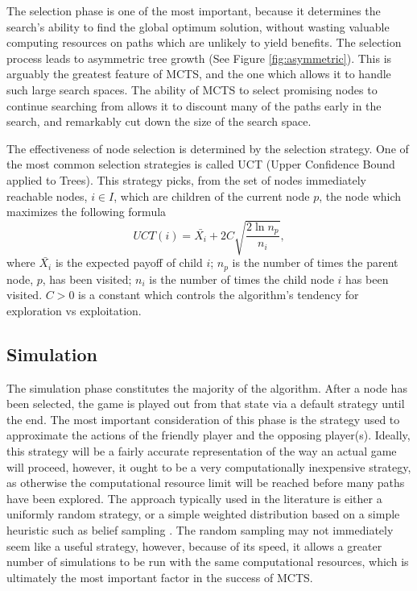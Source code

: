 \documentclass[11pt, letterpaper, twoside]{article}
\begin{document}
The selection phase is one of the most important, because it determines the search's ability to find the global optimum solution, without wasting valuable computing resources on paths which are unlikely to yield benefits. The selection process leads to asymmetric tree growth (See Figure \ref{fig:asymmetric}). This is arguably the greatest feature of MCTS, and the one which allows it to handle such large search spaces. The ability of MCTS to select promising nodes to continue searching from allows it to discount many of the paths early in the search, and remarkably cut down the size of the search space.

The effectiveness of node selection is determined by the selection strategy. One of the most common selection strategies is called UCT \cite{bandit_algorithms} (Upper Confidence Bound applied to Trees). This strategy picks, from the set of nodes immediately reachable nodes, $i \in I$, which are children of the current node $p$, the node which maximizes the following formula
\begin{equation}
	UCT(i)= \bar{X_i} + 2C \sqrt{\frac{2\ln{n_p}}{n_i}},
\end{equation}
	where $\bar{X_i}$ is the expected payoff of child $i$; $n_p$ is the number of times the parent node, $p$, has been visited; $n_i$ is the number of times the child node $i$ has been visited. $C > 0$ is a constant which controls the algorithm's tendency for exploration vs exploitation.

\subsection{Simulation}
	The simulation phase constitutes the majority of the algorithm. After a node has been selected, the game is played out from that state via a default strategy until the end. The most important consideration of this phase is the strategy used to approximate the actions of the friendly player and the opposing player(s). Ideally, this strategy will be a fairly accurate representation of the way an actual game will proceed, however, it ought to be a very computationally inexpensive strategy, as otherwise the computational resource limit will be reached before many paths have been explored. The approach typically used in the literature \cite{mcts_settlers} \cite{mmcts} is either a uniformly random strategy, or a simple weighted distribution based on a simple heuristic such as belief sampling \cite{belief_sampling} \cite{large_belief_states}. The random sampling may not immediately seem like a useful strategy, however, because of its speed, it allows a greater number of simulations to be run with the same computational resources, which is ultimately the most important factor in the success of MCTS.



\end{document}
